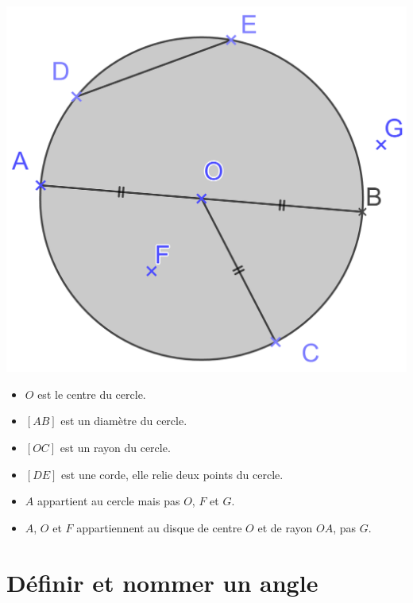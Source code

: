 \documentclass[xcolor={dvipsnames}]{beamer}
\begin{document}
\begin{frame}
	\begin{center}
		\includegraphics[scale=0.1]{cercle}
	\end{center}

	\begin{myex}
		\begin{itemize}
			\item $O$ est \pause  le centre du cercle. \pause
			\item $[AB]$ est \pause un diamètre du cercle. \pause
			\item $[OC]$ est \pause un rayon du cercle. \pause
			\item $[DE]$ est \pause une corde, \pause elle relie deux points du cercle. \pause
			\item $A$ appartient \pause au cercle mais pas $O$, $F$ et $G$. \pause
			\item $A$, $O$ et $F$ \pause appartiennent au disque de centre $O$ et de rayon $OA$, pas $G$.
			
		\end{itemize}
	\end{myex}
\end{frame}

\section{Définir et nommer un angle}
\end{document}
